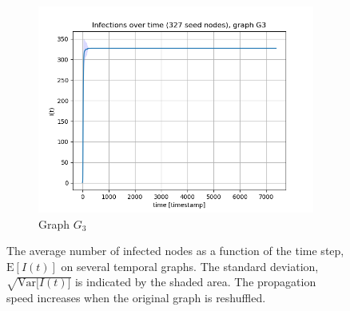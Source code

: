 \documentclass[letterpaper]{article}
\begin{document}
\begin{figure}
\begin{subfigure}[b]{0.32\textwidth}
        \includegraphics[width=\textwidth]{img/infections_G3.png}
        \caption{Graph \(G_3\)}
	    \label{fig:infections_over_time_G3}
    \end{subfigure}
    \caption{\small{The average number of infected nodes as a function of the time step, $\mathrm{E}[I(t)]$ on several temporal graphs. The standard deviation, $\sqrt{\mathrm{Var}{[I(t)}]}$ is indicated by the shaded area. The propagation speed increases when the original graph is reshuffled.}}
    \label{fig:infections_over_time}
	
	\bigskip
	

\end{figure}
\end{document}
